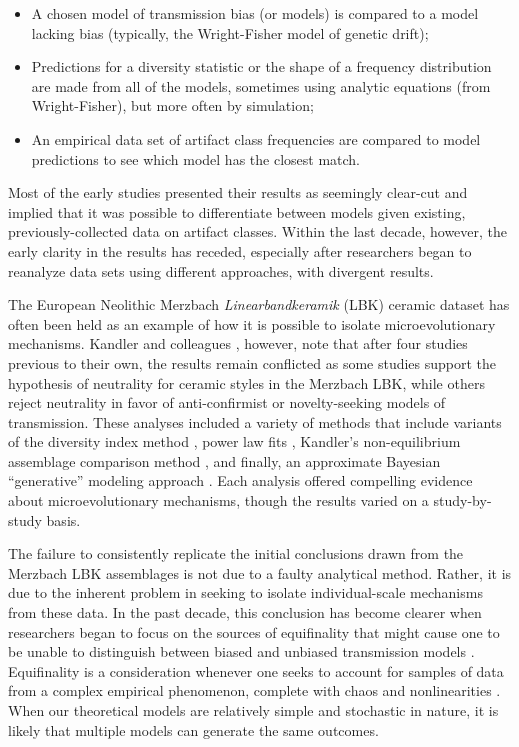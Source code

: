 \begin{itemize}
    \item A chosen model of transmission bias (or models) is compared to a model lacking bias (typically, the Wright-Fisher model of genetic drift);
    \item Predictions for a diversity statistic or the shape of a frequency distribution are made from all of the models, sometimes using analytic equations (from Wright-Fisher), but more often by simulation;
    \item An empirical data set of artifact class frequencies are compared to model predictions to see which model has the closest match.
\end{itemize}

Most of the early studies presented their results as seemingly clear-cut and implied that it was possible to differentiate between models given existing, previously-collected data on artifact classes.  Within the last decade, however, the early clarity in the results has receded, especially after researchers began to reanalyze data sets using different approaches, with divergent results.

The European Neolithic Merzbach \emph{Linearbandkeramik} (LBK) ceramic dataset has often been held as an example of how it is possible to isolate microevolutionary mechanisms. Kandler and colleagues \citeyearpar{Kandler20150905}, however, note that after four studies previous to their own, the results remain conflicted as some studies support the hypothesis of neutrality for ceramic styles in the Merzbach LBK, while others reject neutrality in favor of anti-confirmist or novelty-seeking models of transmission.  These analyses included a variety of methods that include variants of the diversity index method \citep{Shennan2001ceramic,shennan2008style}, power law fits \citep{Bentley2003,shennan2008style}, Kandler's non-equilibrium assemblage comparison method \citep{Kandler2013}, and finally, an approximate Bayesian ``generative'' modeling approach \citep{Kandler20150905}.  Each analysis offered compelling evidence about microevolutionary mechanisms, though the results varied on a study-by-study basis.  

The failure to consistently replicate the initial conclusions drawn from the Merzbach LBK assemblages is not due to a faulty analytical method.  Rather, it is due to the inherent problem in seeking to isolate individual-scale mechanisms from these data.  In the past decade, this conclusion has become clearer when researchers began to focus on the sources of equifinality that might cause one to be unable to distinguish between biased and unbiased transmission models \citep{premo2010equifinality}.  Equifinality is a consideration whenever one seeks to account for samples of data from a complex empirical phenomenon, complete with chaos and nonlinearities \citep{bertalanffy1969general}.  When our theoretical models are relatively simple and stochastic in nature, it is likely that multiple models can generate the same outcomes.  

